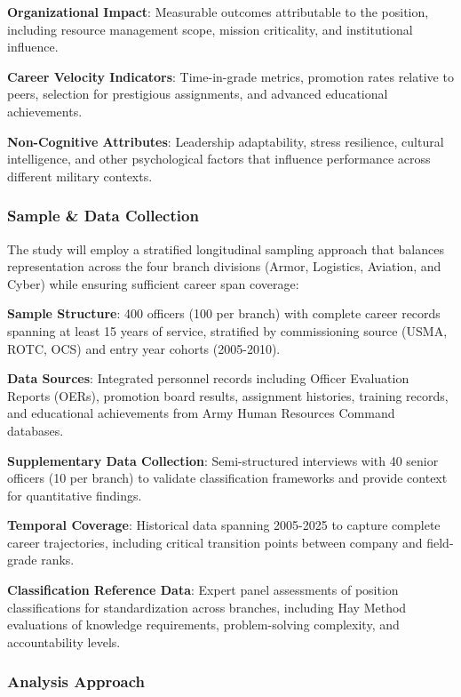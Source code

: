 \documentclass[
  letterpaper,
  DIV=11,
  numbers=noendperiod]{scrartcl}
\begin{document}
\textbf{Organizational Impact}: Measurable outcomes attributable to the
position, including resource management scope, mission criticality, and
institutional influence.

\textbf{Career Velocity Indicators}: Time-in-grade metrics, promotion
rates relative to peers, selection for prestigious assignments, and
advanced educational achievements.

\textbf{Non-Cognitive Attributes}: Leadership adaptability, stress
resilience, cultural intelligence, and other psychological factors that
influence performance across different military contexts.

\subsubsection{Sample \& Data Collection}\label{sample-data-collection}

The study will employ a stratified longitudinal sampling approach that
balances representation across the four branch divisions (Armor,
Logistics, Aviation, and Cyber) while ensuring sufficient career span
coverage:

\textbf{Sample Structure}: 400 officers (100 per branch) with complete
career records spanning at least 15 years of service, stratified by
commissioning source (USMA, ROTC, OCS) and entry year cohorts
(2005-2010).

\textbf{Data Sources}: Integrated personnel records including Officer
Evaluation Reports (OERs), promotion board results, assignment
histories, training records, and educational achievements from Army
Human Resources Command databases.

\textbf{Supplementary Data Collection}: Semi-structured interviews with
40 senior officers (10 per branch) to validate classification frameworks
and provide context for quantitative findings.

\textbf{Temporal Coverage}: Historical data spanning 2005-2025 to
capture complete career trajectories, including critical transition
points between company and field-grade ranks.

\textbf{Classification Reference Data}: Expert panel assessments of
position classifications for standardization across branches, including
Hay Method evaluations of knowledge requirements, problem-solving
complexity, and accountability levels.

\subsubsection{Analysis Approach}\label{analysis-approach}
\end{document}
